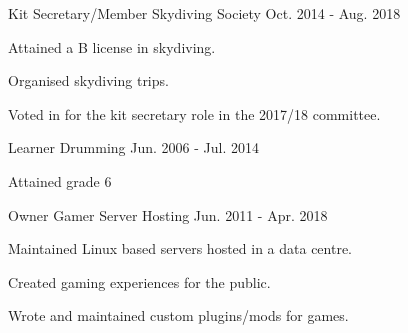 

\begin{cventries}

  \cventry
    {Kit Secretary/Member} %
    {Skydiving Society} %
    {} %
    {Oct. 2014 - Aug. 2018} %
    {
      \begin{cvmitems} %
        \item {Attained a B license in skydiving.}
        \item {Organised skydiving trips.}
        \item {Voted in for the kit secretary role in the 2017/18 committee.}
      \end{cvmitems}
    }

  \cventry
    {Learner} %
    {Drumming} %
    {} %
    {Jun. 2006 - Jul. 2014} %
    {
      \begin{cvitems} %
        \item {Attained grade 6}
      \end{cvitems}
    }

  \cventry
    {Owner} %
    {Gamer Server Hosting} %
    {} %
    {Jun. 2011 - Apr. 2018} %
    {
      \begin{cvmitems} %
        \item {Maintained Linux based servers hosted in a data centre.}
        \item {Created gaming experiences for the public.}
        \item {Wrote and maintained custom plugins/mods for games.}
      \end{cvmitems}
    }

\end{cventries}
